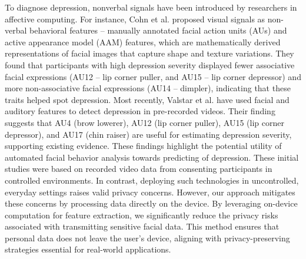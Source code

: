 To diagnose depression, nonverbal signals have been introduced by researchers in affective computing. For instance, Cohn et al. \cite{cohn2009detecting} proposed visual signals as non-verbal behavioral features -- manually annotated facial action units (AUs) and active appearance model (AAM) features, which are mathematically derived representations of facial images that capture shape and texture variations. They found that participants with high depression severity displayed fewer associative facial expressions (AU12 -- lip corner puller, and AU15 -- lip corner depressor) and more non-associative facial expressions (AU14 -- dimpler), indicating that these traits helped spot depression. Most recently, Valstar et al. \cite{song2020spectral, valstar2014avec} have used facial and auditory features to detect depression in pre-recorded videos. Their finding suggests that AU4 (brow lowerer), AU12 (lip corner puller), AU15 (lip corner depressor), and AU17 (chin raiser) are useful for estimating depression severity, supporting existing evidence. These findings highlight the potential utility of automated facial behavior analysis towards predicting of depression. These initial studies were based on recorded video data from consenting participants in controlled environments. In contrast, deploying such technologies in uncontrolled, everyday settings raises valid privacy concerns. However, our approach mitigates these concerns by processing data directly on the device. By leveraging on-device computation for feature extraction, we significantly reduce the privacy risks associated with transmitting sensitive facial data. This method ensures that personal data does not leave the user's device, aligning with privacy-preserving strategies essential for real-world applications.

